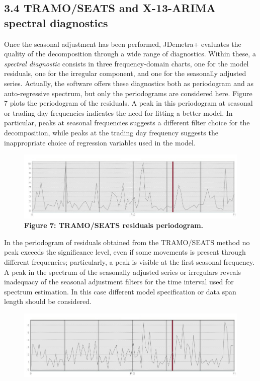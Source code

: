 \documentclass{article}
\begin{document}
\subsection*{\small 3.4 TRAMO/SEATS and X-13-ARIMA spectral diagnostics}
Once the seasonal adjustment has been performed, JDemetra+ evaluates the quality of the decomposition through a wide range of diagnostics. Within these, a \textit{spectral diagnostic} consists in three frequency-domain charts, one for the model residuals, one for the irregular component, and one for the seasonally adjusted series. Actually, the software offers these diagnostics both as periodogram and as auto-regressive spectrum, but only the periodograms are considered here. Figure 7 plots the periodogram of the residuals. A peak in this periodogram at seasonal or trading day frequencies indicates the need for fitting a better model. In particular, peaks at seasonal frequencies suggests a different filter choice for the decomposition, while peaks at the trading day frequency suggests the inappropriate choice of regression variables used in the model.
\begin{figure}[H]
\centering
  \includegraphics[width=\linewidth]{../images/capitolo3/perRES.jpg}
  {\textbf{\scriptsize Figure 7: TRAMO/SEATS residuals periodogram.}}
  \label{fig:1}
\end{figure}
In the periodogram of residuals obtained from the TRAMO/SEATS method no peak exceeds the significance level, even if some movements is present through different frequencies; particularly, a peak is visible at the first seasonal frequency. A peak in the spectrum of the seasonally adjusted series or irregulars reveals inadequacy of the seasonal adjustment filters for the time interval used for spectrum estimation. In this case different model specification or data span length should be considered.
\begin{figure}[H]
  \includegraphics[width=\linewidth]{../images/capitolo3/perIRR.jpg}
\end{figure}
\end{document}
